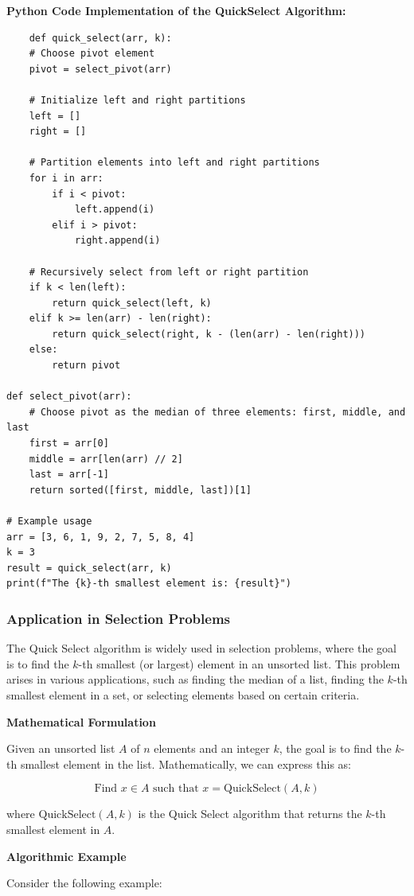 \documentclass[12pt]{book} %
\begin{document}
\textbf{Python Code Implementation of the QuickSelect Algorithm:}
\FloatBarrier
\begin{lstlisting}
    def quick_select(arr, k):
    # Choose pivot element
    pivot = select_pivot(arr)
    
    # Initialize left and right partitions
    left = []
    right = []
    
    # Partition elements into left and right partitions
    for i in arr:
        if i < pivot:
            left.append(i)
        elif i > pivot:
            right.append(i)
    
    # Recursively select from left or right partition
    if k < len(left):
        return quick_select(left, k)
    elif k >= len(arr) - len(right):
        return quick_select(right, k - (len(arr) - len(right)))
    else:
        return pivot

def select_pivot(arr):
    # Choose pivot as the median of three elements: first, middle, and last
    first = arr[0]
    middle = arr[len(arr) // 2]
    last = arr[-1]
    return sorted([first, middle, last])[1]

# Example usage
arr = [3, 6, 1, 9, 2, 7, 5, 8, 4]
k = 3
result = quick_select(arr, k)
print(f"The {k}-th smallest element is: {result}")
\end{lstlisting}

\subsubsection{Application in Selection Problems}
The Quick Select algorithm is widely used in selection problems, where the goal is to find the $k$-th smallest (or largest) element in an unsorted list. This problem arises in various applications, such as finding the median of a list, finding the $k$-th smallest element in a set, or selecting elements based on certain criteria.

\textbf{Mathematical Formulation}

Given an unsorted list $A$ of $n$ elements and an integer $k$, the goal is to find the $k$-th smallest element in the list. Mathematically, we can express this as:

\[
\text{Find } x \in A \text{ such that } x = \text{QuickSelect}(A, k)
\]

where $\text{QuickSelect}(A, k)$ is the Quick Select algorithm that returns the $k$-th smallest element in $A$.

\textbf{Algorithmic Example}

Consider the following example:
\end{document}
